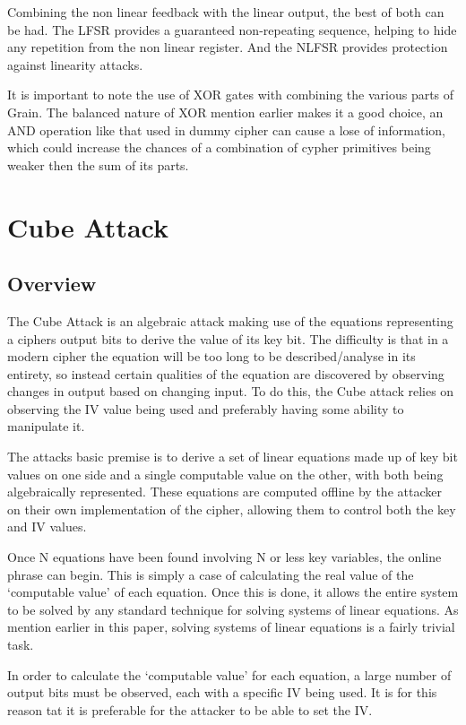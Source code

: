 \documentclass{report}
\let\Oldsection\section
\renewcommand{\section}{\FloatBarrier\Oldsection}
\begin{document}
Combining the non linear feedback with the linear output, the best of both can be had. The LFSR provides a guaranteed non-repeating sequence, helping to hide any repetition from the non linear register. And the NLFSR provides protection against linearity attacks.

It is important to note the use of XOR gates with combining the various parts of Grain. The balanced nature of XOR mention earlier makes it a good choice, an AND operation like that used in dummy cipher can cause a lose of information, which could increase the chances of a combination of cypher primitives being weaker then the sum of its parts.
\chapter{Cube Attack}
\section{Overview}
The Cube Attack is an algebraic attack making use of the equations representing a ciphers output bits to derive the value of its key bit. The difficulty is that in a modern cipher the equation will be too long to be described/analyse in its entirety, so instead certain qualities of the equation are discovered by observing changes in output based on changing input. To do this, the Cube attack relies on observing the IV value being used and preferably having some ability to manipulate it.

The attacks basic premise is to derive a set of linear equations made up of key bit values on one side and a single computable value on the other, with both being algebraically represented. These equations are computed offline by the attacker on their own implementation of the cipher, allowing them to control both the key and IV values.

Once N equations have been found involving N or less key variables, the online phrase can begin. This is simply a case of calculating the real value of the `computable value' of each equation. Once this is done, it allows the entire system to be solved by any standard technique for solving systems of linear equations. As mention earlier in this paper, solving systems of linear equations is a fairly trivial task.

In order to calculate the `computable value' for each equation, a large number of output bits must be observed, each with a specific IV being used. It is for this reason tat it is preferable for the attacker to be able to set the IV.
\end{document}

